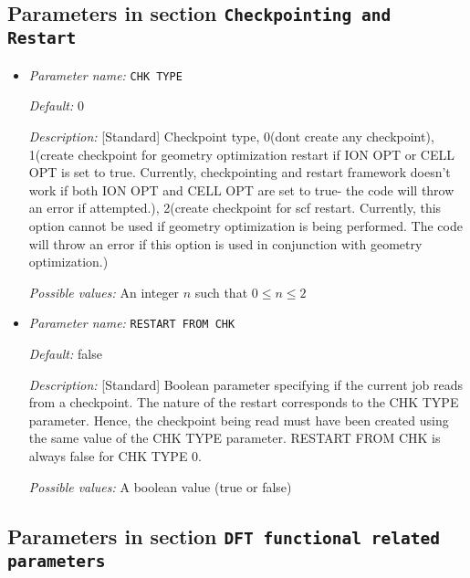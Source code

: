 \subsection{Parameters in section \tt Checkpointing and Restart}
\label{parameters:Checkpointing_20and_20Restart}

\begin{itemize}
\item {\it Parameter name:} {\tt CHK TYPE}
\label{parameters:Checkpointing and Restart/CHK TYPE}
\label{parameters:Checkpointing_20and_20Restart/CHK_20TYPE}




{\it Default:} 0


{\it Description:} [Standard] Checkpoint type, 0(dont create any checkpoint), 1(create checkpoint for geometry optimization restart if ION OPT or CELL OPT is set to true. Currently, checkpointing and restart framework doesn't work if both ION OPT and CELL OPT are set to true- the code will throw an error if attempted.), 2(create checkpoint for scf restart. Currently, this option cannot be used if geometry optimization is being performed. The code will throw an error if this option is used in conjunction with geometry optimization.)


{\it Possible values:} An integer $n$ such that $0\leq n \leq 2$
\item {\it Parameter name:} {\tt RESTART FROM CHK}
\label{parameters:Checkpointing and Restart/RESTART FROM CHK}
\label{parameters:Checkpointing_20and_20Restart/RESTART_20FROM_20CHK}




{\it Default:} false


{\it Description:} [Standard] Boolean parameter specifying if the current job reads from a checkpoint. The nature of the restart corresponds to the CHK TYPE parameter. Hence, the checkpoint being read must have been created using the same value of the CHK TYPE parameter. RESTART FROM CHK is always false for CHK TYPE 0.


{\it Possible values:} A boolean value (true or false)
\end{itemize}

\subsection{Parameters in section \tt DFT functional related parameters}
\label{parameters:DFT_20functional_20related_20parameters}

